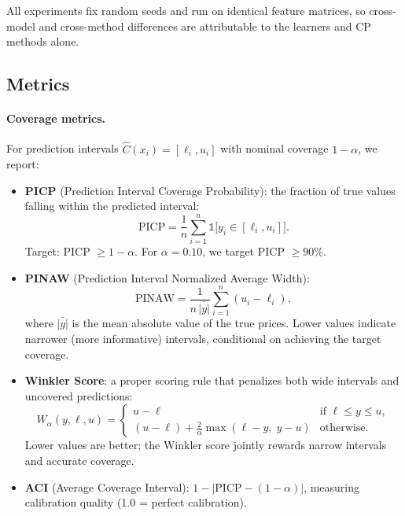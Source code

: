 \documentclass[preprint,12pt]{elsarticle}
\begin{document}
\begin{enumerate}
All experiments fix random seeds and run on identical feature matrices, so cross-model and cross-method differences are attributable to the learners and CP methods alone.

\subsection{Metrics}\label{sec:metrics}

\paragraph{Coverage metrics.} For prediction intervals $\hat{C}(x_i) = [\ell_i, u_i]$ with nominal coverage $1-\alpha$, we report:

\begin{itemize}
  \item \textbf{PICP} (Prediction Interval Coverage Probability): the fraction of true values falling within the predicted interval:
  \begin{equation}
    \text{PICP} = \frac{1}{n}\sum_{i=1}^{n} \mathbb{1}\bigl[y_i \in [\ell_i, u_i]\bigr].
  \end{equation}
  Target: PICP $\ge 1-\alpha$. For $\alpha=0.10$, we target PICP $\ge 90\%$.

  \item \textbf{PINAW} (Prediction Interval Normalized Average Width):
  \begin{equation}
    \text{PINAW} = \frac{1}{n\,\bar{|y|}}\sum_{i=1}^{n}(u_i - \ell_i),
  \end{equation}
  where $\bar{|y|}$ is the mean absolute value of the true prices. Lower values indicate narrower (more informative) intervals, conditional on achieving the target coverage.

  \item \textbf{Winkler Score}: a proper scoring rule that penalizes both wide intervals and uncovered predictions:
  \begin{equation}
    W_\alpha(y, \ell, u) = \begin{cases}
      u - \ell & \text{if } \ell \le y \le u, \\
      (u - \ell) + \frac{2}{\alpha}\max(\ell - y, \; y - u) & \text{otherwise}.
    \end{cases}
  \end{equation}
  Lower values are better; the Winkler score jointly rewards narrow intervals and accurate coverage.

  \item \textbf{ACI} (Average Coverage Interval): $1 - |\text{PICP} - (1-\alpha)|$, measuring calibration quality (1.0 = perfect calibration).
\end{itemize}


\end{enumerate}
\end{document}
